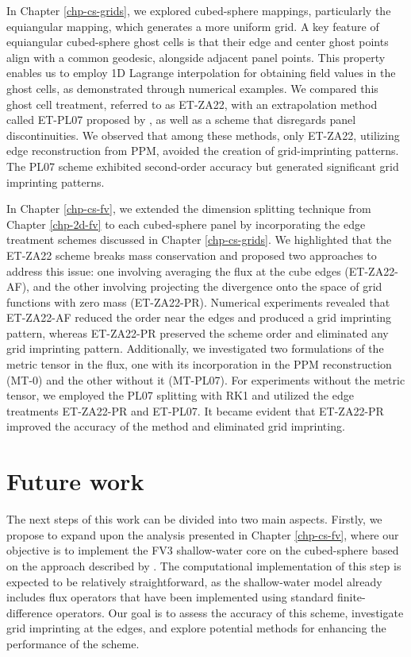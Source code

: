 In Chapter \ref{chp-cs-grids}, we explored cubed-sphere mappings, particularly the equiangular mapping, which generates a more uniform grid.
A key feature of equiangular cubed-sphere ghost cells is that their edge and center ghost points align with a common geodesic, alongside adjacent panel points.
This property enables us to employ 1D Lagrange interpolation for obtaining field values in the ghost cells, as demonstrated through numerical examples.
We compared this ghost cell treatment, referred to as ET-ZA22, with an extrapolation method called ET-PL07 proposed by \citet{putman:2007},
as well as a scheme that disregards panel discontinuities.
We observed that among these methods, only ET-ZA22, utilizing edge reconstruction from PPM, avoided the creation of grid-imprinting patterns.
The PL07 scheme exhibited second-order accuracy but generated significant grid imprinting patterns.

In Chapter \ref{chp-cs-fv}, we extended the dimension splitting technique from Chapter \ref{chp-2d-fv} 
to each cubed-sphere panel by incorporating the edge treatment schemes discussed in Chapter \ref{chp-cs-grids}.
We highlighted that the ET-ZA22 scheme breaks mass conservation and proposed two approaches to address this issue:
one involving averaging the flux at the cube edges (ET-ZA22-AF), and the other involving projecting the divergence
onto the space of grid functions with zero mass (ET-ZA22-PR).
Numerical experiments revealed that ET-ZA22-AF reduced the order near the edges and produced a grid imprinting pattern,
whereas ET-ZA22-PR preserved the scheme order and eliminated any grid imprinting pattern.
Additionally, we investigated two formulations of the metric tensor in the flux, one with its incorporation in the PPM reconstruction (MT-0) and the other without it (MT-PL07).
For experiments without the metric tensor, we employed the PL07 splitting with RK1 and utilized the edge treatments ET-ZA22-PR and ET-PL07.
It became evident that ET-ZA22-PR improved the accuracy of the method and eliminated grid imprinting.

\newpage
\section{Future work}
The next steps of this work can be divided into two main aspects.
Firstly, we propose to expand upon the analysis presented in Chapter \ref{chp-cs-fv},
where our objective is to implement the FV3 shallow-water core on the cubed-sphere based on the approach described by \citet{lin:1997}.
The computational implementation of this step is expected to be relatively straightforward,
as the shallow-water model already includes flux operators that have been implemented using
standard finite-difference operators. Our goal is to assess the accuracy of this scheme,
investigate grid imprinting at the edges, and explore potential methods for enhancing the performance of the scheme.

